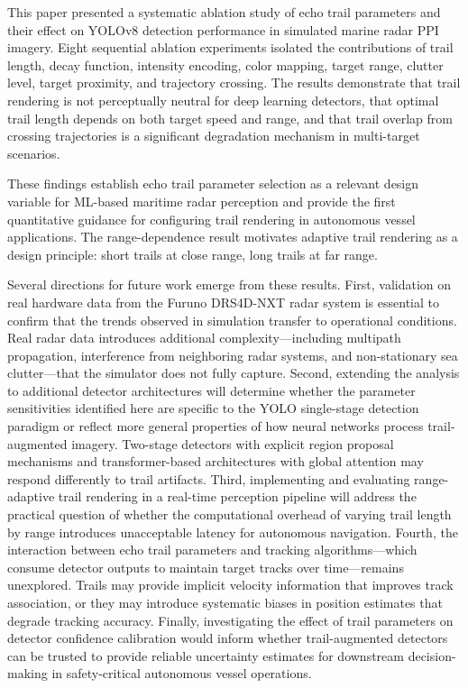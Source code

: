 \documentclass[colorlinks,upint,balance]{asmeconf}
\begin{document}
This paper presented a systematic ablation study of echo trail parameters and their effect on YOLOv8 detection performance in simulated marine radar PPI imagery. Eight sequential ablation experiments isolated the contributions of trail length, decay function, intensity encoding, color mapping, target range, clutter level, target proximity, and trajectory crossing. The results demonstrate that trail rendering is not perceptually neutral for deep learning detectors, that optimal trail length depends on both target speed and range, and that trail overlap from crossing trajectories is a significant degradation mechanism in multi-target scenarios.

These findings establish echo trail parameter selection as a relevant design variable for ML-based maritime radar perception and provide the first quantitative guidance for configuring trail rendering in autonomous vessel applications. The range-dependence result motivates adaptive trail rendering as a design principle: short trails at close range, long trails at far range.

Several directions for future work emerge from these results. First, validation on real hardware data from the Furuno DRS4D-NXT radar system is essential to confirm that the trends observed in simulation transfer to operational conditions. Real radar data introduces additional complexity---including multipath propagation, interference from neighboring radar systems, and non-stationary sea clutter---that the simulator does not fully capture. Second, extending the analysis to additional detector architectures will determine whether the parameter sensitivities identified here are specific to the YOLO single-stage detection paradigm or reflect more general properties of how neural networks process trail-augmented imagery. Two-stage detectors with explicit region proposal mechanisms and transformer-based architectures with global attention may respond differently to trail artifacts. Third, implementing and evaluating range-adaptive trail rendering in a real-time perception pipeline will address the practical question of whether the computational overhead of varying trail length by range introduces unacceptable latency for autonomous navigation. Fourth, the interaction between echo trail parameters and tracking algorithms---which consume detector outputs to maintain target tracks over time---remains unexplored. Trails may provide implicit velocity information that improves track association, or they may introduce systematic biases in position estimates that degrade tracking accuracy. Finally, investigating the effect of trail parameters on detector confidence calibration would inform whether trail-augmented detectors can be trusted to provide reliable uncertainty estimates for downstream decision-making in safety-critical autonomous vessel operations.



\end{document}
